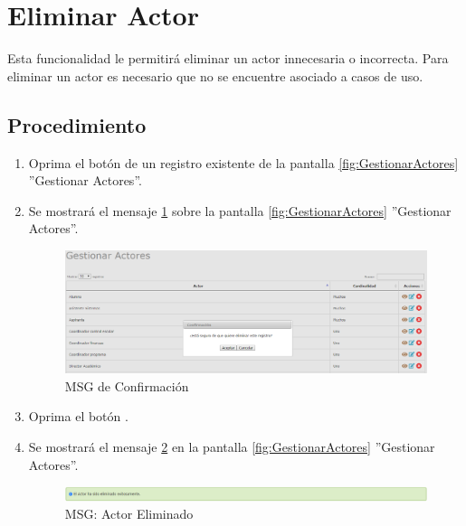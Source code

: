 \hypertarget{cv:eliminarActor}{\section{Eliminar Actor}} \label{sec:eliminarActor}

	Esta funcionalidad le permitirá eliminar un actor innecesaria o incorrecta. Para eliminar un actor es necesario que no se encuentre asociado a casos de uso.

		\subsection{Procedimiento}

			\begin{enumerate}
	
			\item Oprima el botón \IUBotonEliminar{} de un registro existente de la pantalla \ref{fig:GestionarActores} ''Gestionar Actores''.
	
			\item Se mostrará el mensaje \ref{fig:confirmaEliminaActor} sobre la pantalla \ref{fig:GestionarActores} ''Gestionar Actores''.
			
			\begin{figure}[htbp!]
				\begin{center}
					\includegraphics[scale=0.5]{roles/lider/actor/pantallas/IU10-3MSG10}
					\caption{MSG de Confirmación}
					\label{fig:confirmaEliminaActor}
				\end{center}
			\end{figure}
						
			\item Oprima el botón \IUAceptar.
			
			\item Se mostrará el mensaje \ref{fig:actorEliminado} en la pantalla \ref{fig:GestionarActores} ''Gestionar Actores''.
			
			\begin{figure}[htbp!]
				\begin{center}
					\includegraphics[scale=0.5]{roles/lider/actor/pantallas/IU10-3MSG1}
					\caption{MSG: Actor Eliminado}
					\label{fig:actorEliminado}
				\end{center}
			\end{figure}
			\end{enumerate}